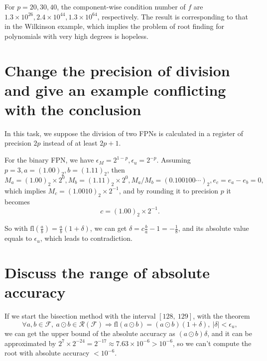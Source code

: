 \documentclass[a4paper]{article}
\begin{document}
For $p = 20, 30, 40$, the component-wise condition number of $f$ are $1.3 \times 10^{26}, 2.4 \times 10^{44}, 1.3 \times 10^{64}$, respectively. The result is corresponding to that in the Wilkinson example, which implies the problem of root finding for polynomials with very high degrees is hopeless.

\section{Change the precision of division and give an example conflicting with the conclusion}

In this task, we suppose the division of two FPNs is calculated in a register of precision $2p$ instead of at least $2p + 1$.

For the binary FPN, we have $\epsilon_M = 2^{1 - p}, \epsilon_u = 2^{-p}$. Assuming $p = 3, a = (1.00)_2, b = (1.11)_2$, then 
\begin{equation}
    M_a = (1.00)_2 \times 2^0, M_b = (1.11)_2 \times 2^0, M_a / M_b = (0.100100\cdots)_2, e_c = e_a - e_b = 0,
    \label{eq:12_division_binary}
\end{equation} 
which implies $M_c = (1.0010)_2 \times 2^{-1}$, and by rounding it to precision $p$ it becomes 
\begin{equation}
    c = (1.00)_2 \times 2^{-1}.
    \label{eq:12_division_binary_result}
\end{equation}

So with $\text{fl}(\frac{a}{b}) = \frac{a}{b}(1 + \delta)$, we can get $\delta = c \frac{b}{a} - 1 = -\frac{1}{8}$, and its absolute value equals to $\epsilon_u$, which leads to contradiction.

\section{Discuss the range of absolute accuracy}

If we start the bisection method with the interval $[128,\ 129]$, with the theorem 
\begin{equation}
    \forall a, b \in \mathcal{F},\ a \odot b \in \mathcal{R(F)} \Rightarrow \text{fl}(a \odot b) = (a \odot b)(1 + \delta),\ |\delta| < \epsilon_u,
    \label{eq:13_bisection_theorem}
\end{equation}
we can get the upper bound of the absolute accuracy as $(a \odot b)\delta$, and it can be approximated by $2^7 \times 2^{-24} = 2^{-17} \approx 7.63 \times 10^{-6} > 10^{-6}$, so we can't compute the root with absolute accuracy $< 10^{-6}$.
\end{document}
